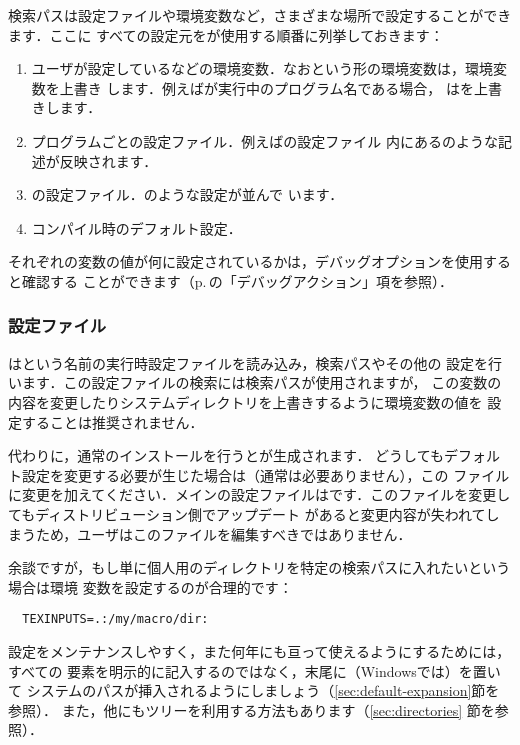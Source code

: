 \documentclass[uplatex,dvipdfmx,tombow]{jsarticle}
\begin{document}
検索パスは設定ファイルや環境変数など，さまざまな場所で設定することができます．ここに
すべての設定元を\KPS が使用する順番に列挙しておきます：
%
\begin{enumerate}
\item ユーザが設定しているなどの環境変数．なおという形の環境変数は，環境変数を上書き
  します．例えばが実行中のプログラム名である場合，%
  はを上書きします．
\item プログラムごとの設定ファイル．例えばの設定ファイル%
  内にあるのような記述が反映されます．
\item \KPS の設定ファイル．のような設定が並んで
  います．
\item コンパイル時のデフォルト設定．
\end{enumerate}
%
それぞれの変数の値が何に設定されているかは，デバッグオプションを使用すると確認する
ことができます（p.\,\pageref{sec:debugging}の「デバッグアクション」項を参照）．

\subsubsection{設定ファイル}

\KPS はという名前の実行時設定ファイルを読み込み，検索パスやその他の
設定を行います．この設定ファイルの検索には検索パスが使用されますが，
この変数の内容を変更したりシステムディレクトリを上書きするように環境変数の値を
設定することは推奨されません．

代わりに，通常のインストールを行うとが生成されます．
どうしてもデフォルト設定を変更する必要が生じた場合は（通常は必要ありません），この
ファイルに変更を加えてください．メインの設定ファイルはです．このファイルを変更してもディストリビューション側でアップデート
があると変更内容が失われてしまうため，ユーザはこのファイルを編集すべきではありません．

余談ですが，もし単に個人用のディレクトリを特定の検索パスに入れたいという場合は環境
変数を設定するのが合理的です：
%
\begin{verbatim}
  TEXINPUTS=.:/my/macro/dir:
\end{verbatim}
%
設定をメンテナンスしやすく，また何年にも亘って使えるようにするためには，すべての
要素を明示的に記入するのではなく，末尾に\samp{:}（Windowsでは\samp{;}）を置いて
システムのパスが挿入されるようにしましょう（\ref{sec:default-expansion}節を参照）．
また，他にもツリーを利用する方法もあります（\ref{sec:directories}%
節を参照）．
\end{document}
